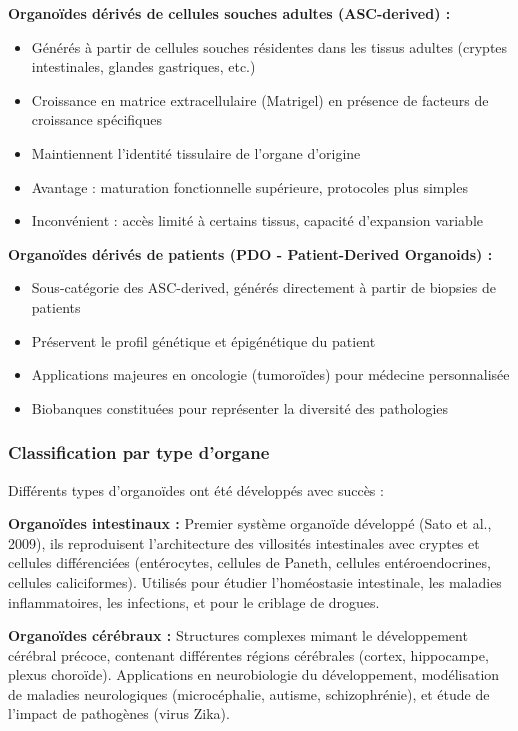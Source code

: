 \textbf{Organoïdes dérivés de cellules souches adultes (ASC-derived) :}
\begin{itemize}
    \item Générés à partir de cellules souches résidentes dans les tissus adultes (cryptes intestinales, glandes gastriques, etc.)
    \item Croissance en matrice extracellulaire (Matrigel) en présence de facteurs de croissance spécifiques
    \item Maintiennent l'identité tissulaire de l'organe d'origine
    \item Avantage : maturation fonctionnelle supérieure, protocoles plus simples
    \item Inconvénient : accès limité à certains tissus, capacité d'expansion variable
\end{itemize}

\textbf{Organoïdes dérivés de patients (PDO - Patient-Derived Organoids) :}
\begin{itemize}
    \item Sous-catégorie des ASC-derived, générés directement à partir de biopsies de patients
    \item Préservent le profil génétique et épigénétique du patient
    \item Applications majeures en oncologie (tumoroïdes) pour médecine personnalisée
    \item Biobanques constituées pour représenter la diversité des pathologies
\end{itemize}

\subsubsection{Classification par type d'organe}

Différents types d'organoïdes ont été développés avec succès :

\textbf{Organoïdes intestinaux :}
Premier système organoïde développé (Sato et al., 2009), ils reproduisent l'architecture des villosités intestinales avec cryptes et cellules différenciées (entérocytes, cellules de Paneth, cellules entéroendocrines, cellules caliciformes). Utilisés pour étudier l'homéostasie intestinale, les maladies inflammatoires, les infections, et pour le criblage de drogues.

\textbf{Organoïdes cérébraux :}
Structures complexes mimant le développement cérébral précoce, contenant différentes régions cérébrales (cortex, hippocampe, plexus choroïde). Applications en neurobiologie du développement, modélisation de maladies neurologiques (microcéphalie, autisme, schizophrénie), et étude de l'impact de pathogènes (virus Zika).

